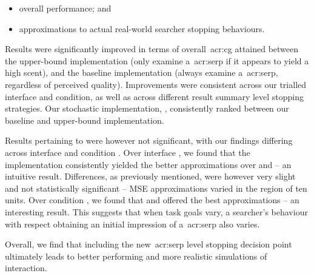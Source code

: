 \begin{itemize}
    \item{ overall performance; and}
    \item{ approximations to actual real-world searcher stopping behaviours.}
\end{itemize}

Results were significantly improved in terms of overall~\gls{acr:cg} attained between the upper-bound  implementation (only examine a~\gls{acr:serp} if it appears to yield a high scent), and the baseline  implementation (always examine a~\gls{acr:serp}, regardless of perceived quality). Improvements were consistent across our trialled interface and condition, as well as across different result summary level stopping strategies. Our stochastic implementation, , consistently ranked between our baseline and upper-bound implementation.

Results pertaining to  were however not significant, with our findings differing across interface  and condition . Over interface , we found that the  implementation consistently yielded the better approximations over  and  -- an intuitive result. Differences, as previously mentioned, were however very slight and not statistically significant -- MSE approximations varied in the region of ten units. Over condition , we found that  and  offered the best approximations -- an interesting result. This suggests that when task goals vary, a searcher's behaviour with respect obtaining an initial impression of a~\gls{acr:serp} also varies.

Overall, we find that including the new~\gls{acr:serp} level stopping decision point ultimately leads to better performing and more realistic simulations of interaction.


\newpage
\thispagestyle{empty}
\mbox{}
